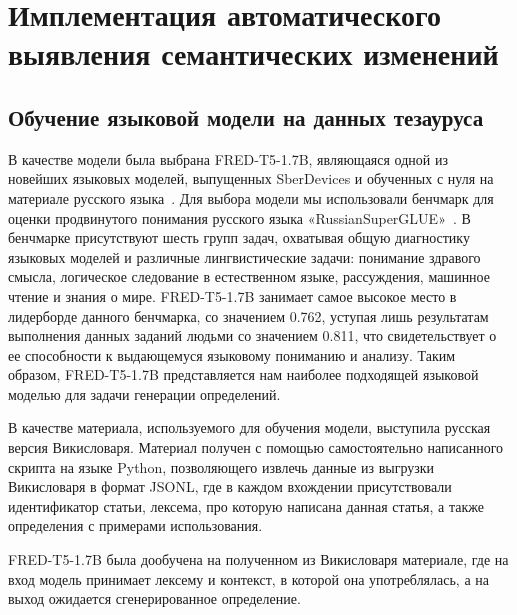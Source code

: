 \documentclass[LI,VKR]{HSEUniversity}
\begin{document}
\chapter{Имплементация автоматического выявления семантических изменений}

\section{Обучение языковой модели на данных тезауруса}

В качестве модели была выбрана FRED-T5-1.7B, являющаяся одной из новейших языковых моделей,
выпущенных SberDevices и обученных с нуля на материале русского языка~\cite{FRED-T5}.
Для выбора модели мы использовали бенчмарк для оценки продвинутого понимания русского языка
«RussianSuperGLUE»~\cite{RussianSuperGLUE}. В бенчмарке присутствуют шесть групп задач, охватывая общую диагностику языковых моделей и различные лингвистические задачи: понимание здравого смысла, логическое
следование в естественном языке, рассуждения, машинное чтение и знания о мире.
FRED-T5-1.7B занимает самое высокое место в лидерборде данного бенчмарка, со значением 0.762,
уступая лишь результатам выполнения данных заданий людьми со значением 0.811,
что свидетельствует о ее способности к выдающемуся языковому пониманию и анализу.
Таким образом, FRED-T5-1.7B представляется нам наиболее подходящей языковой моделью
для задачи генерации определений.

В качестве материала, используемого для обучения модели, выступила русская версия Викисловаря.
Материал получен с помощью самостоятельно написанного скрипта на языке Python, позволяющего
извлечь данные из выгрузки Викисловаря в формат JSONL, где в каждом вхождении присутствовали
идентификатор статьи, лексема, про которую написана данная статья, а также определения
с примерами использования.

FRED-T5-1.7B была дообучена на полученном из Викисловаря материале, где на вход модель
принимает лексему и контекст, в которой она употреблялась, а на выход ожидается сгенерированное
определение.
\end{document}
